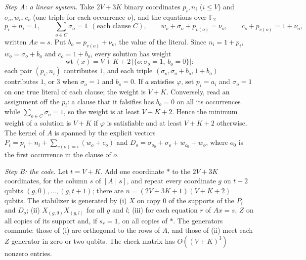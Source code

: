 \documentclass[11pt]{article}
\theoremstyle{remark}
\newcommand{\F}{\mathbb F_2}
\begin{document}
\emph{Step A: a linear system.} Take \(2V+3K\) binary coordinates
\(p_i,n_i\) (\(i\le V\)) and \(\sigma_o,w_o,c_o\) (one triple for each
occurrence \(o\)), and the equations over \(\F\)
\[
 p_i+n_i=1,\qquad \sum_{o\in C}\sigma_o=1\ \ (\text{each clause }C),\qquad
 w_o+\sigma_o+p_{v(o)}=\nu_o,\qquad c_o+p_{v(o)}=1+\nu_o ,
\]
written \(Ax=s\). Put \(b_o=p_{v(o)}+\nu_o\), the value of the literal.
Since \(n_i=1+p_i\), \(w_o=\sigma_o+b_o\) and \(c_o=1+b_o\), every
solution has weight
\[
 \operatorname{wt}(x)=V+K+2\,\bigl|\{o:\sigma_o=1,\ b_o=0\}\bigr| :
\]
each pair \((p_i,n_i)\) contributes \(1\), and each triple
\((\sigma_o,\sigma_o+b_o,1+b_o)\) contributes \(1\), or \(3\) when
\(\sigma_o=1\) and \(b_o=0\). If \(a\) satisfies \(\varphi\), set
\(p_i=a_i\) and \(\sigma_o=1\) on one true literal of each clause; the
weight is \(V+K\). Conversely, read an assignment off the \(p_i\): a
clause that it falsifies has \(b_o=0\) on all its occurrences while
\(\sum_{o\in C}\sigma_o=1\), so the weight is at least \(V+K+2\). Hence
the minimum weight of a solution is \(V+K\) if \(\varphi\) is
satisfiable and at least \(V+K+2\) otherwise. The kernel of \(A\) is
spanned by the explicit vectors
\(P_i=p_i+n_i+\sum_{v(o)=i}(w_o+c_o)\) and
\(D_o=\sigma_{o_0}+\sigma_o+w_{o_0}+w_o\), where \(o_0\) is the first
occurrence in the clause of \(o\).

\emph{Step B: the code.} Let \(t=V+K\). Add one coordinate \(\ast\) to
the \(2V+3K\) coordinates, for the column \(s\) of \([A\mid s]\), and
repeat every coordinate \(g\) on \(t+2\) qubits
\((g,0),\dots,(g,t+1)\); there are \(n=(2V+3K+1)(V+K+2)\) qubits. The
stabilizer is generated by (i) \(X\) on copy \(0\) of the supports of
the \(P_i\) and \(D_o\); (ii) \(X_{(g,0)}X_{(g,l)}\) for all \(g\) and
\(l\); (iii) for each equation \(r\) of \(Ax=s\), \(Z\) on all copies of
its support and, if \(s_r=1\), on all copies of \(\ast\). The generators
commute: those of (i) are orthogonal to the rows of \(A\), and those of
(ii) meet each \(Z\)-generator in zero or two qubits. The check matrix
has \(O((V+K)^3)\) nonzero entries.
\end{document}
